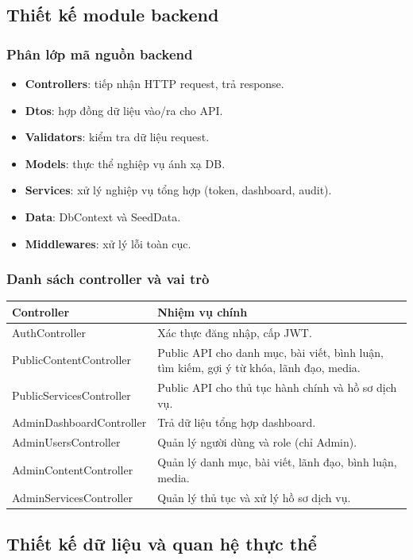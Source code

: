 \documentclass[12pt,a4paper]{article}
\begin{document}
\subsection{Thiết kế module backend}
\subsubsection{Phân lớp mã nguồn backend}
\begin{itemize}[leftmargin=1.1cm]
  \item \textbf{Controllers}: tiếp nhận HTTP request, trả response.
  \item \textbf{Dtos}: hợp đồng dữ liệu vào/ra cho API.
  \item \textbf{Validators}: kiểm tra dữ liệu request.
  \item \textbf{Models}: thực thể nghiệp vụ ánh xạ DB.
  \item \textbf{Services}: xử lý nghiệp vụ tổng hợp (token, dashboard, audit).
  \item \textbf{Data}: DbContext và SeedData.
  \item \textbf{Middlewares}: xử lý lỗi toàn cục.
\end{itemize}

\subsubsection{Danh sách controller và vai trò}
\begin{longtable}{p{4.4cm}p{9.3cm}}
\toprule
\textbf{Controller} & \textbf{Nhiệm vụ chính} \\
\midrule
AuthController & Xác thực đăng nhập, cấp JWT. \\
PublicContentController & Public API cho danh mục, bài viết, bình luận, tìm kiếm, gợi ý từ khóa, lãnh đạo, media. \\
PublicServicesController & Public API cho thủ tục hành chính và hồ sơ dịch vụ. \\
AdminDashboardController & Trả dữ liệu tổng hợp dashboard. \\
AdminUsersController & Quản lý người dùng và role (chỉ Admin). \\
AdminContentController & Quản lý danh mục, bài viết, lãnh đạo, bình luận, media. \\
AdminServicesController & Quản lý thủ tục và xử lý hồ sơ dịch vụ. \\
\bottomrule
\end{longtable}

\subsection{Thiết kế dữ liệu và quan hệ thực thể}
\end{document}
